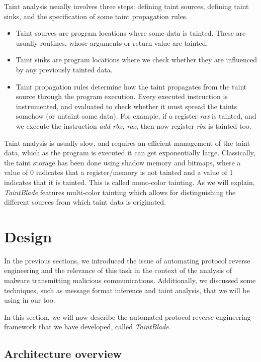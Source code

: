 \documentclass[conference]{IEEEtran}
\begin{document}
Taint analysis usually involves three steps: defining taint sources, defining
taint sinks, and the specification of some taint propagation rules.
\begin{itemize}
    \item Taint sources are program locations where some data is tainted. These are
          usually routines, whose arguments or return value are tainted.
    \item Taint sinks are program locations where we check whether they are influenced by
          any previously tainted data.
    \item Taint propagation rules determine how the taint propagates from the taint
          source through the program execution. Every executed instruction is
          instrumented, and evaluated to check whether it must spread the taints somehow
          (or untaint some data). For example, if a register \textit{rax} is tainted, and
          we execute the instruction \textit{add rbx, rax}, then now register
          \textit{rbx} is tainted too.
\end{itemize}

Taint analysis is usually slow, and requires an efficient management of the
taint data, which as the program is executed it can get exponentially large.
Classically, the taint storage has been done using shadow memory and bitmaps,
where a value of 0 indicates that a register/memory is not tainted and a value
of 1 indicates that it is tainted. This is called mono-color tainting. As we 
will explain, \textit{TaintBlade} features multi-color tainting which allows
for distinguishing the different sources from which taint data is originated.

\section{Design} \label{sec:design}
In the previous sections, we introduced the issue of automating protocol
reverse engineering and the relevance of this task in the context of the
analysis of malware transmitting malicious communications. Additionally, we
discussed some techniques, such as message format inference and taint analysis,
that we will be using in our too.

In this section, we will now describe the automated protocol reverse
engineering framework that we have developed, called \textit{TaintBlade}.

\subsection{Architecture overview}
\end{document}
